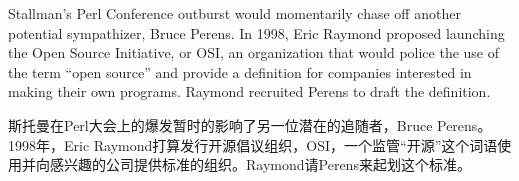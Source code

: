 \ifdefined\eng
Stallman's Perl Conference outburst would momentarily chase off another potential sympathizer, Bruce Perens. In 1998, Eric Raymond proposed launching the Open Source Initiative, or OSI, an organization that would police the use of the term ``open source'' and provide a definition for companies interested in making their own programs. Raymond recruited Perens to draft the definition.\endnote{}
\fi

\ifdefined\chs
斯托曼在Perl大会上的爆发暂时的影响了另一位潜在的追随者，Bruce Perens。1998年，Eric Raymond打算发行开源倡议组织，OSI，一个监管``开源''这个词语使用并向感兴趣的公司提供标准的组织。Raymond请Perens来起划这个标准。\endnote{}
\fi







